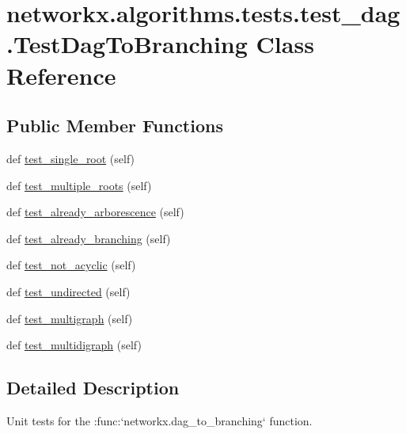 \hypertarget{classnetworkx_1_1algorithms_1_1tests_1_1test__dag_1_1TestDagToBranching}{}\section{networkx.\+algorithms.\+tests.\+test\+\_\+dag.\+Test\+Dag\+To\+Branching Class Reference}
\label{classnetworkx_1_1algorithms_1_1tests_1_1test__dag_1_1TestDagToBranching}
\subsection*{Public Member Functions}
\begin{DoxyCompactItemize}
\item 
def \hyperlink{classnetworkx_1_1algorithms_1_1tests_1_1test__dag_1_1TestDagToBranching_ae1e2940962018b75982af123fe52dc4f}{test\+\_\+single\+\_\+root} (self)
\item 
def \hyperlink{classnetworkx_1_1algorithms_1_1tests_1_1test__dag_1_1TestDagToBranching_af6d949081401a99ff9d3a53696f65d35}{test\+\_\+multiple\+\_\+roots} (self)
\item 
def \hyperlink{classnetworkx_1_1algorithms_1_1tests_1_1test__dag_1_1TestDagToBranching_a14427f00d734153784755105950edd10}{test\+\_\+already\+\_\+arborescence} (self)
\item 
def \hyperlink{classnetworkx_1_1algorithms_1_1tests_1_1test__dag_1_1TestDagToBranching_a366b57b62871d18afc8ec4de5eb2ac80}{test\+\_\+already\+\_\+branching} (self)
\item 
def \hyperlink{classnetworkx_1_1algorithms_1_1tests_1_1test__dag_1_1TestDagToBranching_a8ca2abfb5ebeb4a6218613b2b031c23d}{test\+\_\+not\+\_\+acyclic} (self)
\item 
def \hyperlink{classnetworkx_1_1algorithms_1_1tests_1_1test__dag_1_1TestDagToBranching_a54173379a2517c12af8d489254788be3}{test\+\_\+undirected} (self)
\item 
def \hyperlink{classnetworkx_1_1algorithms_1_1tests_1_1test__dag_1_1TestDagToBranching_a3b90eb93b63ca86589a0a1aa90059b4c}{test\+\_\+multigraph} (self)
\item 
def \hyperlink{classnetworkx_1_1algorithms_1_1tests_1_1test__dag_1_1TestDagToBranching_a4ed496949ecd14df12e950020899f7fe}{test\+\_\+multidigraph} (self)
\end{DoxyCompactItemize}


\subsection{Detailed Description}
\begin{DoxyVerb}Unit tests for the :func:`networkx.dag_to_branching` function.\end{DoxyVerb}
 

